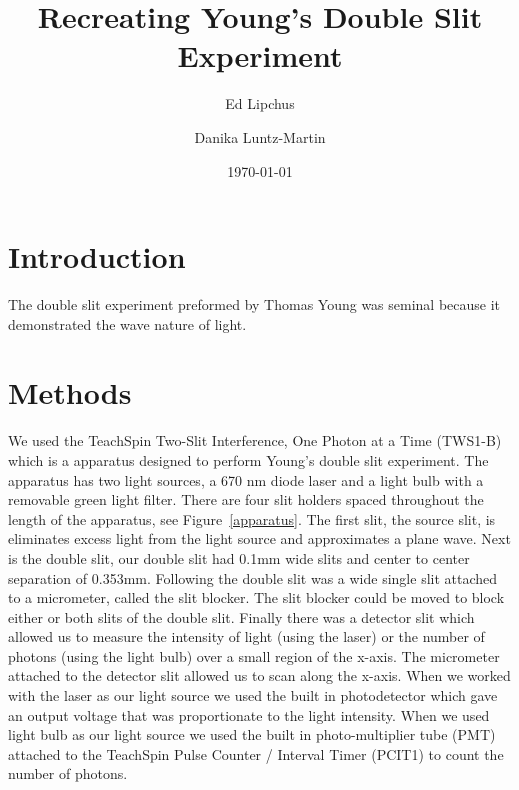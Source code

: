 \documentclass[prb,preprint]{revtex4-1}
\begin{document}
\title{Recreating Young's Double Slit Experiment}


\author{Ed Lipchus}


\author{Danika Luntz-Martin}


\date{\today}



\begin{abstract}


\end{abstract}

\maketitle 


\section{Introduction} 

The double slit experiment preformed by Thomas Young was seminal because it demonstrated the wave nature of light. 

\section{Methods}

We used the TeachSpin Two-Slit Interference, One Photon at a Time (TWS1-B) which is a apparatus designed to perform Young's double slit experiment. The apparatus has two light sources, a 670 nm diode laser and a light bulb with a removable green light filter. There are four slit holders spaced throughout the length of the apparatus, see Figure~\ref{apparatus}. The first slit, the source slit, is eliminates excess light from the light source and approximates a plane wave. Next is the double slit, our double slit had 0.1mm wide slits and center to center separation of 0.353mm. Following the double slit was a wide single slit attached to a micrometer, called the slit blocker. The slit blocker could be moved to block either or both slits of the double slit. Finally there was a detector slit which allowed us to measure the intensity of light (using the laser) or the number of photons (using the light bulb) over a small region of the x-axis. The micrometer attached to the detector slit allowed us to scan along the x-axis. When we worked with the laser as our light source we used the built in photodetector which gave an output voltage that was proportionate to the light intensity. When we used light bulb as our light source we used the built in photo-multiplier tube (PMT) attached to the TeachSpin Pulse Counter / Interval Timer (PCIT1) to count the number of photons.
\end{document}
